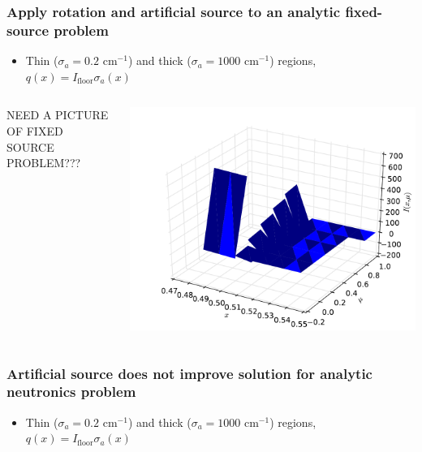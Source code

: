 \documentclass[xcolor=dvipsnames,hyperref={pdfpagelabels=false},unknownkeysallowed]{beamer}
\newlength{\wideitemsep}
\let\olditem\item
\renewcommand{\item}{\setlength{\itemsep}{\wideitemsep}\olditem}
\begin{document}
\begin{frame}
    \frametitle{Apply rotation and artificial source to an analytic fixed-source problem}
    \begin{itemize}
        \item Thin ($\sigma_a=0.2$ cm$^{-1}$) and thick ($\sigma_a=1000$ cm$^{-1}$) regions, $q(x)={I_{\text{floor}}}{\sigma_a(x)}$
    \end{itemize}
    \begin{columns}
    \begin{column}{0.5\textwidth}
        \vspace{0pt}
  \centering
  NEED A PICTURE OF FIXED SOURCE PROBLEM???
    \end{column}
    \begin{column}{0.5\textwidth}
        \vspace{0pt}
        \centering
        \includegraphics[width=\linewidth]{neut_ang_zoom.pdf}
    \end{column}
\end{columns}
\end{frame}

\begin{frame}
    \frametitle{Artificial source does not improve solution for analytic neutronics problem}
    \begin{itemize}
        \item Thin ($\sigma_a=0.2$ cm$^{-1}$) and thick ($\sigma_a=1000$ cm$^{-1}$) regions, $q(x)={I_{\text{floor}}}{\sigma_a(x)}$
    \end{itemize}
    \begin{table}
        
    \end{table}
\end{frame}
\end{document}
